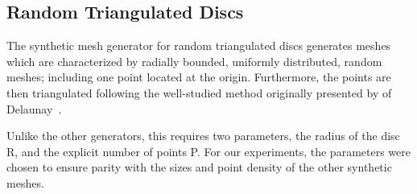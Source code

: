 

%
%
%
%
\pagebreak
\subsection{Random Triangulated Discs}
The synthetic mesh generator for random triangulated discs generates meshes which are characterized by radially bounded, uniformly distributed, random meshes; including one point located at the origin. Furthermore, the points are then triangulated following the well-studied method originally presented by of Delaunay~\cite{Delaunay34}.

Unlike the other generators, this requires two parameters, the radius of the disc R, and the explicit number of points P. For our experiments, the parameters were chosen to ensure parity with the sizes and point density of the other synthetic meshes.




